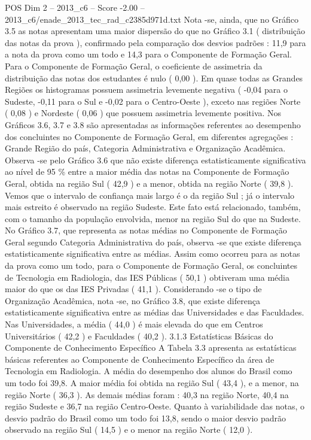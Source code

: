 \begin{textsample}{POS Dim 2 – 2013\_c6 – Score -2.00 – 2013\_c6/enade\_2013\_tec\_rad\_c2385d971d.txt}
Nota -se, ainda, que no Gráfico 3.5 as notas apresentam uma maior dispersão do que no Gráfico 3.1 ( distribuição das notas da prova ), confirmado pela comparação dos desvios padrões : 11,9 para a nota da prova como um todo e 14,3 para o Componente de Formação Geral.
Para o Componente de Formação Geral, o coeficiente de assimetria da distribuição das notas dos estudantes é nulo ( 0,00 ).
Em quase todas as Grandes Regiões os histogramas possuem assimetria levemente negativa ( -0,04 para o Sudeste, -0,11 para o Sul e -0,02 para o Centro-Oeste ), exceto nas regiões Norte ( 0,08 ) e Nordeste ( 0,06 ) que possuem assimetria levemente positiva.
Nos Gráficos 3.6, 3.7 e 3.8 são apresentadas as informações referentes ao desempenho dos concluintes no Componente de Formação Geral, em diferentes agregações : Grande Região do país, Categoria Administrativa e Organização Acadêmica.
Observa -se pelo Gráfico 3.6 que não existe diferença estatisticamente significativa ao nível de 95 \% entre a maior média das notas na Componente de Formação Geral, obtida na região Sul ( 42,9 ) e a menor, obtida na região Norte ( 39,8 ).
Vemos que o intervalo de confiança mais largo é o da região Sul ; já o intervalo mais estreito é observado na região Sudeste.
Este fato está relacionado, também, com o tamanho da população envolvida, menor na região Sul do que na Sudeste.
No Gráfico 3.7, que representa as notas médias no Componente de Formação Geral segundo Categoria Administrativa do país, observa -se que existe diferença estatisticamente significativa entre as médias.
Assim como ocorreu para as notas da prova como um todo, para o Componente de Formação Geral, os concluintes de Tecnologia em Radiologia, das IES Públicas ( 50,1 ) obtiveram uma média maior do que os das IES Privadas ( 41,1 ).
Considerando -se o tipo de Organização Acadêmica, nota -se, no Gráfico 3.8, que existe diferença estatisticamente significativa entre as médias das Universidades e das Faculdades.
Nas Universidades, a média ( 44,0 ) é mais elevada do que em Centros Universitários ( 42,2 ) e Faculdades ( 40,2 ). 3.1.3 Estatísticas Básicas do Componente de Conhecimento Específico A Tabela 3.3 apresenta as estatísticas básicas referentes ao Componente de Conhecimento Específico da área de Tecnologia em Radiologia.
A média do desempenho dos alunos do Brasil como um todo foi 39,8.
A maior média foi obtida na região Sul ( 43,4 ), e a menor, na região Norte ( 36,3 ).
As demais médias foram : 40,3 na região Norte, 40,4 na região Sudeste e 36,7 na região Centro-Oeste.
Quanto à variabilidade das notas, o desvio padrão do Brasil como um todo foi 13,8, sendo o maior desvio padrão observado na região Sul ( 14,5 ) e o menor na região Norte ( 12,0 ).

\end{textsample}
